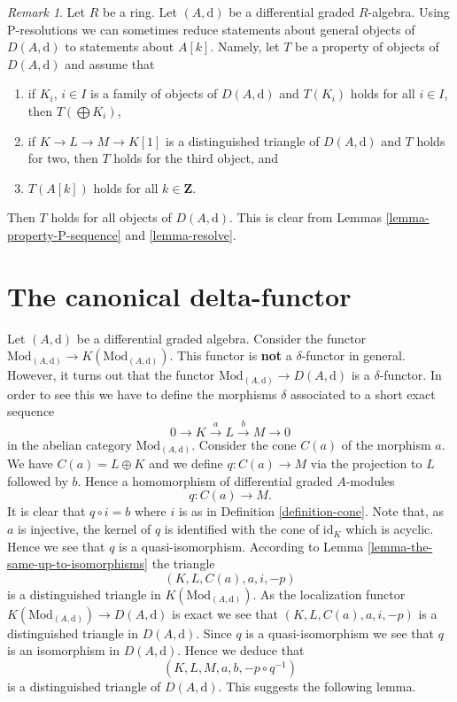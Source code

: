 \documentclass{stacks-project}
\theoremstyle{plain}
\theoremstyle{definition}
\theoremstyle{remark}
\newtheorem{remark}[subsection]{Remark}
\numberwithin{equation}{subsection}
\begin{document}
\begin{remark}
\label{remark-P-resolution}
Let $R$ be a ring. Let $(A, \text{d})$ be a differential graded $R$-algebra.
Using P-resolutions we can sometimes reduce statements about general
objects of $D(A, \text{d})$ to statements about $A[k]$. Namely, let
$T$ be a property of objects of $D(A, \text{d})$ and assume that
\begin{enumerate}
\item if $K_i$, $i \in I$ is a family of objects of $D(A, \text{d})$
and $T(K_i)$ holds for all $i \in I$, then $T(\bigoplus K_i)$,
\item if $K \to L \to M \to K[1]$ is a distinguished triangle of
$D(A, \text{d})$ and $T$ holds for two, then $T$
holds for the third object, and
\item $T(A[k])$ holds for all $k \in \mathbf{Z}$.
\end{enumerate}
Then $T$ holds for all objects of $D(A, \text{d})$. This is clear from
Lemmas \ref{lemma-property-P-sequence} and \ref{lemma-resolve}.
\end{remark}







\section{The canonical delta-functor}
\label{section-canonical-delta-functor}

\noindent
Let $(A, \text{d})$ be a differential graded algebra.
Consider the functor
$\text{Mod}_{(A, \text{d})} \to K(\text{Mod}_{(A, \text{d})})$.
This functor is {\bf not} a $\delta$-functor in general.
However, it turns out that the functor
$\text{Mod}_{(A, \text{d})} \to D(A, \text{d})$ is a
$\delta$-functor. In order to see this we have to define
the morphisms $\delta$ associated to a short exact sequence
$$
0 \to K \xrightarrow{a} L \xrightarrow{b} M \to 0
$$
in the abelian category $\text{Mod}_{(A, \text{d})}$.
Consider the cone $C(a)$ of the morphism $a$. We have $C(a) = L \oplus K$
and we define $q : C(a) \to M$ via the projection to $L$ followed
by $b$. Hence a homomorphism of differential graded $A$-modules
$$
q : C(a) \longrightarrow M.
$$
It is clear that $q \circ i = b$ where $i$ is as in
Definition \ref{definition-cone}.
Note that, as $a$ is injective, the kernel of $q$ is identified with the
cone of $\text{id}_K$ which is acyclic. Hence we see that
$q$ is a quasi-isomorphism. According to
Lemma \ref{lemma-the-same-up-to-isomorphisms}
the triangle
$$
(K, L, C(a), a, i, -p)
$$
is a distinguished triangle in $K(\text{Mod}_{(A, \text{d})})$.
As the localization functor
$K(\text{Mod}_{(A, \text{d})}) \to D(A, \text{d})$ is
exact we see that $(K, L, C(a), a, i, -p)$ is a distinguished
triangle in $D(A, \text{d})$. Since $q$ is a quasi-isomorphism
we see that $q$ is an isomorphism in $D(A, \text{d})$.
Hence we deduce that
$$
(K, L, M, a, b, -p \circ q^{-1})
$$
is a distinguished triangle of $D(A, \text{d})$.
This suggests the following lemma.
\end{document}
